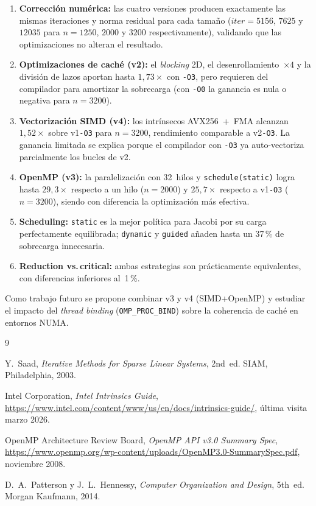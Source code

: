 \documentclass[a4paper,twocolumn]{article}
\begin{document}
\begin{enumerate}
  \item \textbf{Corrección numérica:} las cuatro versiones producen
        exactamente las mismas iteraciones y norma residual para cada
        tamaño ($\mathit{iter}{=}5156$, $7625$ y $12035$ para $n{=}1250$,
        $2000$ y $3200$ respectivamente), validando que las optimizaciones
        no alteran el resultado.
  \item \textbf{Optimizaciones de caché (v2):} el \textit{blocking} 2D,
        el desenrollamiento~$\times 4$ y la división de lazos aportan hasta
        $1{,}73\times$ con \texttt{-O3}, pero requieren del compilador para
        amortizar la sobrecarga (con \texttt{-O0} la ganancia es nula o
        negativa para $n{=}3200$).
  \item \textbf{Vectorización SIMD (v4):} los intrínsecos AVX256~+~FMA
        alcanzan $1{,}52\times$ sobre v1\texttt{-O3} para $n{=}3200$,
        rendimiento comparable a v2\texttt{-O3}. La ganancia limitada se
        explica porque el compilador con \texttt{-O3} ya auto-vectoriza
        parcialmente los bucles de v2.
  \item \textbf{OpenMP (v3):} la paralelización con 32~hilos y
        \texttt{schedule(static)} logra hasta $29{,}3\times$ respecto a un
        hilo ($n{=}2000$) y $25{,}7\times$ respecto a v1\texttt{-O3}
        ($n{=}3200$), siendo con diferencia la optimización más efectiva.
  \item \textbf{Scheduling:} \texttt{static} es la mejor política para Jacobi
        por su carga perfectamente equilibrada; \texttt{dynamic} y
        \texttt{guided} añaden hasta un 37\,\% de sobrecarga innecesaria.
  \item \textbf{Reduction vs.\,critical:} ambas estrategias son
        prácticamente equivalentes, con diferencias inferiores al~1\,\%.
\end{enumerate}

Como trabajo futuro se propone combinar v3 y v4 (SIMD+OpenMP) y estudiar el
impacto del \textit{thread binding} (\texttt{OMP\_PROC\_BIND}) sobre la coherencia
de caché en entornos NUMA.

\begin{thebibliography}{9}

  Y.~Saad,
  \textit{Iterative Methods for Sparse Linear Systems}, 2nd~ed.
  SIAM, Philadelphia, 2003.

  Intel Corporation,
  \textit{Intel Intrinsics Guide},
  \url{https://www.intel.com/content/www/us/en/docs/intrinsics-guide/},
  \newblock [online] última visita marzo 2026.

  OpenMP Architecture Review Board,
  \textit{OpenMP API v3.0 Summary Spec},
  \url{https://www.openmp.org/wp-content/uploads/OpenMP3.0-SummarySpec.pdf},
  noviembre 2008.

  D.~A.~Patterson y J.~L.~Hennessy,
  \textit{Computer Organization and Design}, 5th~ed.
  Morgan Kaufmann, 2014.

\end{thebibliography}
\end{document}
